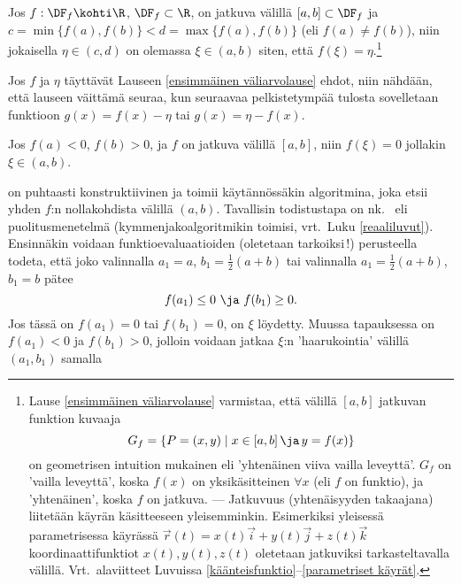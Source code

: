 \begin{Lause} \label{ensimmäinen väliarvolause}
Jos $f:\DF_f\kohti\R$, $\DF_f\subset\R$, on jatkuva välillä $[a,b]\subset\DF_f$ ja 
$c=\min\{f(a),f(b)\}<d=\max\{f(a),f(b)\}$ (eli $f(a) \neq f(b)$), niin jokaisella 
$\eta\in (c,d)$ on olemassa $\xi \in (a,b)$ siten, että $f(\xi)=\eta$.\footnote[2]{Lause
\ref{ensimmäinen väliarvolause} varmistaa, että välillä $[a,b]$ jatkuvan funktion kuvaaja 
\[
G_f=\{P=(x,y) \mid x\in[a,b]\,\ja\,y=f(x)\}
\]
on geometrisen intuition mukainen  eli 'yhtenäinen viiva vailla leveyttä'. $G_f$ on
'vailla leveyttä', koska $f(x)$ on yksikäsitteinen $\forall x$ (eli $f$ on funktio), ja
'yhtenäinen', koska $f$ on jatkuva. --- Jatkuvuus (yhtenäisyyden takaajana) liitetään käyrän
käsitteeseen yleisemminkin. Esimerkiksi yleisessä parametrisessa käyrässä
$\vec r(t)=x(t)\vec i+y(t)\vec j+z(t)\vec k$ koordinaattifunktiot $x(t),y(t),z(t)$ oletetaan
jatkuviksi tarkasteltavalla välillä. Vrt.\ alaviitteet Luvuissa
\ref{käänteisfunktio}--\ref{parametriset käyrät}. } 
\end{Lause}
Jos $f$ ja $\eta$ täyttävät Lauseen \ref{ensimmäinen väliarvolause} ehdot, niin nähdään, että 
lauseen väittämä seuraa, kun seuraavaa pelkistetympää tulosta sovelletaan funktioon 
$g(x)=f(x)-\eta$ tai $g(x)=\eta-f(x)$.
\begin{Lause}  \label{Bolzanon lause} 
Jos $f(a)<0$, $f(b)>0$, ja $f$ on jatkuva välillä $[a,b]$, niin $f(\xi)=0$ jollakin
$\xi\in (a,b)$.
\end{Lause}
\tod on puhtaasti konstruktiivinen ja toimii käytännössäkin algoritmina, joka 
etsii yhden $f$:n nollakohdista välillä $(a,b)$. Tavallisin todistustapa on nk.\  
 eli puolitusmenetelmä (kymmenjakoalgoritmikin toimisi, vrt.\ Luku
\ref{reaaliluvut}). Ensinnäkin voidaan funktioevaluaatioiden (oletetaan tarkoiksi\,!)
perusteella todeta, että joko valinnalla $a_1=a$, $b_1=\frac{1}{2}(a+b)$ tai valinnalla 
$a_1=\frac{1}{2}(a+b)$, $b_1=b$ pätee
\[
f(a_1) \le 0 \ \ja \ f(b_1) \ge 0.
\]
Jos tässä on $f(a_1)=0$ tai $f(b_1)=0$, on $\xi$ löydetty. Muussa tapauksessa on $f(a_1)<0$ ja
$f(b_1)>0$, jolloin voidaan jatkaa $\xi$:n 'haarukointia' välillä $(a_1,b_1)$ samalla
